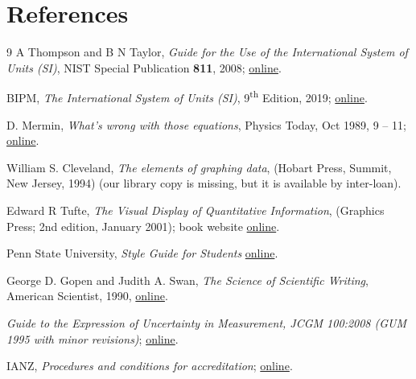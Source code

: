 \section*{References}

\begingroup
\renewcommand{\section}[2]{}%

\begin{thebibliography}{9}
A Thompson and B N Taylor, \textit{Guide for the Use of the International System of Units (SI)}, NIST Special Publication \textbf{811}, 2008; \href{http://www.nist.gov/pml/pubs/sp811/index.cfm}{online}.

BIPM, \textit{The International System of Units (SI)}, 9\textsuperscript{th} Edition, 2019; \href{https://www.bipm.org/en/publications/si-brochure/}{online}.

D. Mermin, \textit{What’s wrong with those equations}, Physics Today, Oct 1989, 9 – 11; \href{http://home.sandiego.edu/~severn/p480w/mathprose.pdf}{online}. 

William S. Cleveland, \textit{The elements of graphing data}, (Hobart Press, Summit, New Jersey, 1994) (our library copy is missing, but it is available by inter-loan).

Edward R Tufte, \textit{The Visual Display of Quantitative Information}, (Graphics Press; 2nd edition, January 2001); book website \href{http://www.edwardtufte.com/tufte/books_vdqi}{online}.

Penn State University, \textit{Style Guide for Students} \href{https://www.e-education.psu.edu/styleforstudents/}{online}.

George D. Gopen and Judith A. Swan, \textit{The Science of Scientific Writing}, American Scientist, 1990, \href{https://www.americanscientist.org/blog/the-long-view/the-science-of-scientific-writing}{online}.

 \textit{Guide to the Expression of Uncertainty in Measurement, JCGM 100:2008 (GUM 1995 with minor revisions)}; \href{http://www.bipm.org/utils/common/documents/jcgm/JCGM_100_2008_E.pdf}{online}.

 IANZ, \textit{Procedures and conditions for accreditation}; \href{https://www.ianz.govt.nz/media/ddub3rh4/as1-procedures-and-conditions-for-accreditation.pdf}{online}.


\end{thebibliography}
